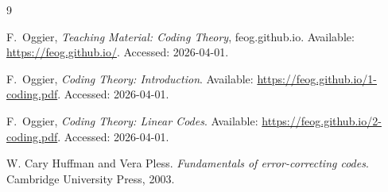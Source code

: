 \documentclass[11pt,openany]{article}
\begin{document}
%	
%	
%	
%	

\begin{thebibliography}{9}
	
	F.~Oggier,
	\emph{Teaching Material: Coding Theory},
	feog.github.io.
	Available: \url{https://feog.github.io/}.
	Accessed: 2026-04-01.
	
	F.~Oggier,
	\emph{Coding Theory: Introduction}.
	Available: \url{https://feog.github.io/1-coding.pdf}.
	Accessed: 2026-04-01.
	
	F.~Oggier,
	\emph{Coding Theory: Linear Codes}.
	Available: \url{https://feog.github.io/2-coding.pdf}.
	Accessed: 2026-04-01.
	
	W. Cary Huffman and Vera Pless. \emph{Fundamentals of error-correcting codes}.
	Cambridge University Press, 2003.
\end{thebibliography}
\end{document}
